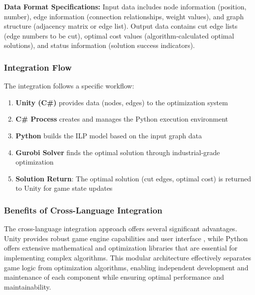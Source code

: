 \documentclass[english]{tudscrreprt}
\begin{document}
\textbf{Data Format Specifications:} Input data includes node information (position, number), edge information (connection relationships, weight values), and graph structure (adjacency matrix or edge list). Output data contains cut edge lists (edge numbers to be cut), optimal cost values (algorithm-calculated optimal solutions), and status information (solution success indicators).

\subsubsection{Integration Flow}
The integration follows a specific workflow:

\begin{enumerate}
  \item \textbf{Unity (C\#)} provides data (nodes, edges) to the optimization system
  \item \textbf{C\# Process} creates and manages the Python execution environment
  \item \textbf{Python} builds the ILP model based on the input graph data
  \item \textbf{Gurobi Solver} finds the optimal solution through industrial-grade optimization
  \item \textbf{Solution Return}: The optimal solution (cut edges, optimal cost) is returned to Unity for game state updates
\end{enumerate}

\subsubsection{Benefits of Cross-Language Integration}
The cross-language integration approach offers several significant advantages. Unity provides robust game engine capabilities and user interface \cite{unity2023}, while Python offers extensive mathematical and optimization libraries that are essential for implementing complex algorithms. This modular architecture effectively separates game logic from optimization algorithms, enabling independent development and maintenance of each component while ensuring optimal performance and maintainability.
\end{document}

